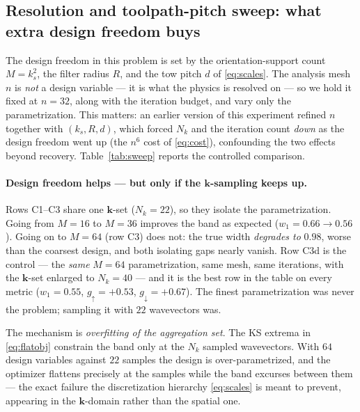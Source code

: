 \documentclass[11pt]{article}
\begin{document}
\subsection{Resolution and toolpath-pitch sweep: what extra design freedom buys}
\label{sec:meta:sweep}
The design freedom in this problem is set by the orientation-support count
$M=k_s^2$, the filter radius $R$, and the tow pitch $d$ of \eqref{eq:scales}. The
analysis mesh $n$ is \emph{not} a design variable --- it is what the physics is
resolved on --- so we hold it fixed at $n=32$, along with the iteration budget,
and vary only the parametrization. This matters: an earlier version of this
experiment refined $n$ together with $(k_s,R,d)$, which forced $N_k$ and the
iteration count \emph{down} as the design freedom went up (the $n^6$ cost of
\eqref{eq:cost}), confounding the two effects beyond recovery.
Table~\ref{tab:sweep} reports the controlled comparison.



\paragraph{Design freedom helps --- but only if the $\mathbf k$-sampling keeps up.}
Rows C1--C3 share one $\mathbf k$-set ($N_k=22$), so they isolate the
parametrization. Going from $M=16$ to $M=36$ improves the band as expected
($w_1=0.66\to0.56$). Going on to $M=64$ (row C3) does not: the true width
\emph{degrades to} $0.98$, worse than the coarsest design, and both isolating gaps
nearly vanish. Row C3d is the control --- the \emph{same} $M=64$ parametrization,
same mesh, same iterations, with the $\mathbf k$-set enlarged to $N_k=40$ --- and
it is the best row in the table on every metric ($w_1=0.55$,
$g_\uparrow=+0.53$, $g_\downarrow=+0.67$). The finest parametrization was never
the problem; sampling it with $22$ wavevectors was.

The mechanism is \emph{overfitting of the aggregation set}. The KS extrema in
\eqref{eq:flatobj} constrain the band only at the $N_k$ sampled wavevectors. With
$64$ design variables against $22$ samples the design is over-parametrized, and
the optimizer flattens precisely at the samples while the band excurses between
them --- the exact failure the discretization hierarchy \eqref{eq:scales} is meant
to prevent, appearing in the $\mathbf k$-domain rather than the spatial one.
\end{document}
